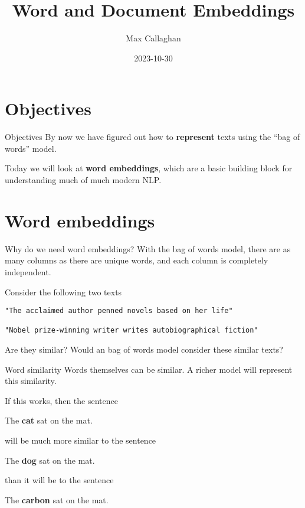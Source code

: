 \documentclass[
  10pt,
  ignorenonframetext,
  aspectratio=169]{beamer}
\title{Word and Document Embeddings}
\author{Max Callaghan}
\date{2023-10-30}
\begin{document}
\frame{\titlepage}

\hypertarget{objectives}{%
\section{Objectives}\label{objectives}}

\begin{frame}{Objectives}
\protect\hypertarget{objectives-1}{}
By now we have figured out how to \textbf{represent} texts using the
``bag of words'' model.

Today we will look at \textbf{word embeddings}, which are a basic
building block for understanding much of much modern NLP.
\end{frame}

\hypertarget{word-embeddings}{%
\section{Word embeddings}\label{word-embeddings}}

\begin{frame}[fragile]{Why do we need word embeddings?}
\protect\hypertarget{why-do-we-need-word-embeddings}{}
With the bag of words model, there are as many columns as there are
unique words, and each column is completely independent.

Consider the following two texts

\begin{verbatim}
"The acclaimed author penned novels based on her life"

"Nobel prize-winning writer writes autobiographical fiction"
\end{verbatim}

Are they similar? Would an bag of words model consider these similar
texts?
\end{frame}

\begin{frame}{Word similarity}
\protect\hypertarget{word-similarity}{}
Words themselves can be similar. A richer model will represent this
similarity.

If this works, then the sentence

The \textbf{cat} sat on the mat.

will be much more similar to the sentence

The \textbf{dog} sat on the mat.

than it will be to the sentence

The \textbf{carbon} sat on the mat.
\end{frame}
\end{document}
